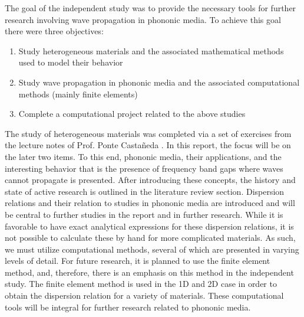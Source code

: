 \documentclass{article}
\begin{document}
The goal of the independent study was to provide the necessary tools for 
further research involving wave propagation in phononic media. To achieve this 
goal there were three objectives:
\begin{enumerate}
	\item Study heterogeneous materials and the associated mathematical methods 
	used to model their behavior
	\item Study wave propagation in phononic media and the associated 
	computational methods (mainly finite elements)
	\item Complete a computational project related to the above studies 
\end{enumerate}
The study of heterogeneous materials was completed via a set of exercises from 
the lecture notes of Prof. Ponte Casta\~neda \cite{pontenotes}. In this report, 
the focus will be on the later two items. To this end, phononic media, their 
applications, and the interesting behavior that is the 
presence of frequency band gaps where waves cannot propagate is presented.
After introducing these concepts, the history and state of active research is 
outlined in the literature review section. Dispersion relations and their 
relation to studies in phononic media are introduced and will be central to 
further studies in the report and in further research. While it is favorable to 
have exact analytical expressions for these dispersion relations, it is not 
possible to calculate these by hand for more complicated materials. As such, we 
must utilize computational methods, several of which are presented in varying 
levels of detail. For future research, it is planned to use the finite element 
method, and, therefore, there is an emphasis on this method in the independent 
study. The finite element method is used in the 1D and 2D case in order to 
obtain the dispersion relation for a variety of materials. These computational 
tools will be integral for further research related to phononic media. 

\end{document}

